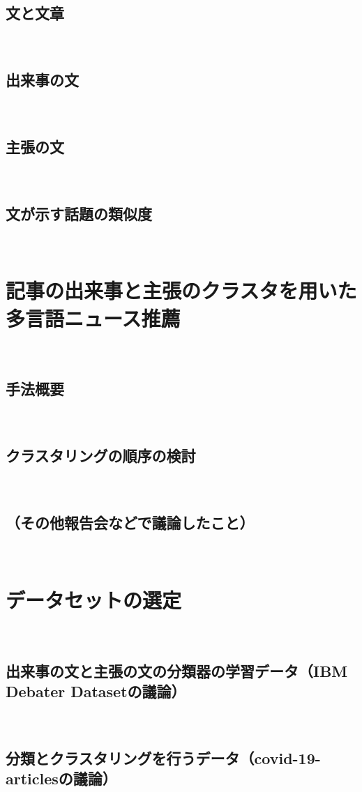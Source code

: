 \documentclass[12pt,a4j]{jreport}
\begin{document}
\subsection{文と文章}
~

\subsection{出来事の文}
~

\subsection{主張の文}
~

\subsection{文が示す話題の類似度}
~

\section{記事の出来事と主張のクラスタを用いた多言語ニュース推薦}
~

\subsection{手法概要}
~

\subsection{クラスタリングの順序の検討}
~

\subsection{（その他報告会などで議論したこと）}
~

\section{データセットの選定}
~

\subsection{出来事の文と主張の文の分類器の学習データ（IBM Debater Datasetの議論）}
~

\subsection{分類とクラスタリングを行うデータ（covid-19-articlesの議論）}
~
\end{document}
